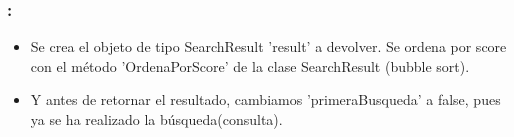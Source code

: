 \documentclass{beamer}
\begin{document}
\begin{frame}
  \frametitle{\Large \insertsection : \insertsubsection} 
\begin{itemize}
    \item Se crea el objeto de tipo SearchResult 'result' a devolver. Se ordena por score con el método 'OrdenaPorScore'
     de la clase SearchResult (bubble sort).
     \pause
    \item Y antes de retornar el resultado, cambiamos 'primeraBusqueda' a false, pues ya se ha realizado la búsqueda(consulta).
\end{itemize}
\end{frame}
\end{document}
